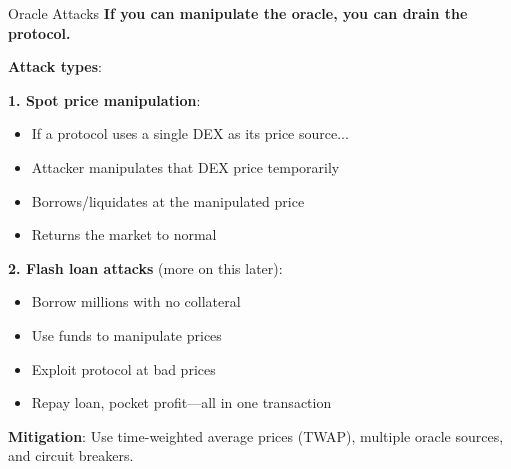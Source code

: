 \documentclass[10pt]{beamer}
\begin{document}
\begin{frame}{Oracle Attacks}
  \textbf{If you can manipulate the oracle, you can drain the protocol.}
  
  \vspace{1em}
  \textbf{Attack types}:
  
  \vspace{0.5em}
  \textbf{1. Spot price manipulation}:
  \begin{itemize}
    \item If a protocol uses a single DEX as its price source...
    \item Attacker manipulates that DEX price temporarily
    \item Borrows/liquidates at the manipulated price
    \item Returns the market to normal
  \end{itemize}
  
  \vspace{0.5em}
  \textbf{2. Flash loan attacks} (more on this later):
  \begin{itemize}
    \item Borrow millions with no collateral
    \item Use funds to manipulate prices
    \item Exploit protocol at bad prices
    \item Repay loan, pocket profit---all in one transaction
  \end{itemize}
  
  \vspace{0.5em}
  \textbf{Mitigation}: Use time-weighted average prices (TWAP), multiple oracle sources, and circuit breakers.
\end{frame}
\end{document}
